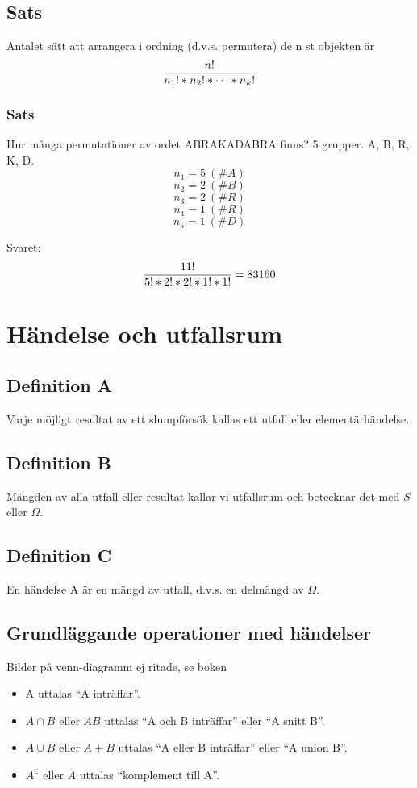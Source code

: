 \documentclass{article}
\begin{document}
\subsection{Sats}
Antalet sätt att arrangera i ordning (d.v.s. permutera) de n st objekten är
$$ \frac{n!}{n_1!*n_2!*\dots*n_k!} $$

\subsubsection{Sats}
Hur många permutationer av ordet ABRAKADABRA finns? 5 grupper. A, B, R, K, D.
$$ n_1 = 5\ (\#A) $$
$$ n_2 = 2\ (\#B) $$
$$ n_3 = 2\ (\#R) $$
$$ n_4 = 1\ (\#R) $$
$$ n_5 = 1\ (\#D) $$

Svaret:
$$ \frac{11!}{5!*2!*2!*1!*1!} = 83160 $$

\section{Händelse och utfallsrum}
\subsection{Definition A}
Varje möjligt resultat av ett slumpförsök kallas ett utfall eller elementärhändelse.

\subsection{Definition B}
Mängden av alla utfall eller resultat kallar vi utfallsrum och betecknar det med $S$ eller $\Omega$.

\subsection{Definition C}
En händelse A är en mängd av utfall, d.v.s. en delmängd av $\Omega$.

\subsection{Grundläggande operationer med händelser}
{\color{red}Bilder på venn-diagramm ej ritade, se boken}
\begin{itemize}
    \item A uttalas ``A inträffar''.\\
    \item $A\cap B$ eller $AB$ uttalas ``A och B inträffar'' eller ``A snitt B''.\\
    \item $A\cup B$ eller $A + B$ uttalas ``A eller B inträffar'' eller ``A union B''.\\
    \item $A^\complement$ eller $\overline{A}$ uttalas ``komplement till A''.\\
\end{itemize}
\end{document}

